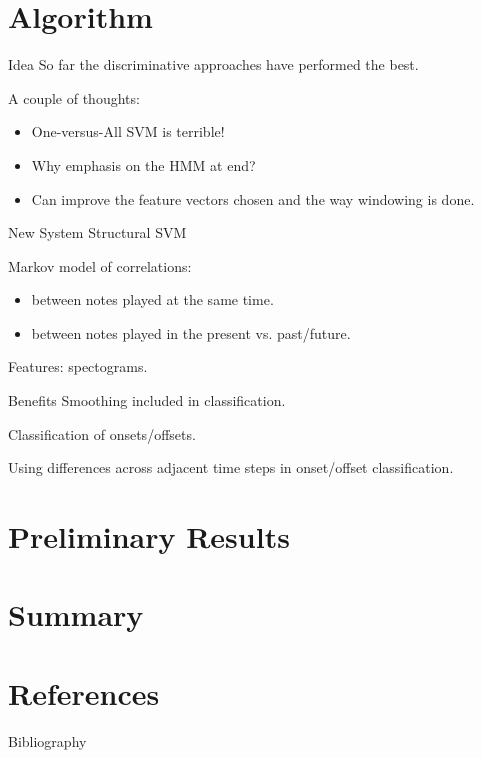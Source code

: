\documentclass{beamer}
\begin{document}
\section{Algorithm}
\begin{frame}{Idea}
So far the discriminative approaches have performed the best.

\pause
A couple of thoughts:
\begin{itemize}
\item One-versus-All SVM is terrible!
\item Why emphasis on the HMM at end? %
\item Can improve the feature vectors chosen and the way windowing is done.
\end{itemize}
\end{frame}

\begin{frame}{New System}
Structural SVM

\vspace{1em}
Markov model of correlations:
\begin{itemize}
\item between notes played at the same time.
\item between notes played in the present vs. past/future.
\end{itemize}

\vspace{1em}
Features: spectograms.
\end{frame}

\begin{frame}{Benefits}
Smoothing included in classification.

\vspace{1em}
Classification of onsets/offsets.

\vspace{1em}
Using differences across adjacent time steps in onset/offset classification.
\end{frame}

\section{Preliminary Results}
\begin{frame}
\end{frame}

\section{Summary}
\begin{frame}
\end{frame}

\section{References}
\begin{frame}{Bibliography}

\nocite{*}

\end{frame}
\end{document}
